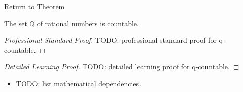 \newpage
{}
\label{prf:q-countable}

\begin{remark*}[Return]
\hyperref[thm:Q-countable]{Return to Theorem}
\end{remark*}


\begin{theorem*}
The set $\mathbb{Q}$ of rational numbers is countable.
\end{theorem*}

\begin{proof}[Professional Standard Proof]
\LRAProofBodyStart
TODO: professional standard proof for q-countable.
\end{proof}

\begin{proof}[Detailed Learning Proof]
\LRAProofBodyStart
TODO: detailed learning proof for q-countable.
\end{proof}

\begin{remark*}
\end{remark*}

\begin{dependencies}
\begin{itemize}
  \item TODO: list mathematical dependencies.
\end{itemize}
\end{dependencies}

\clearpage
